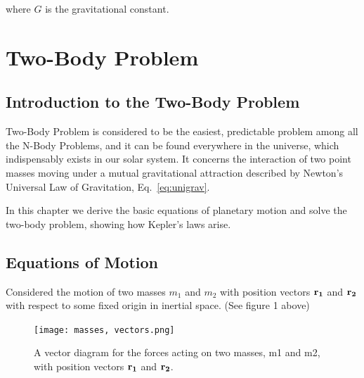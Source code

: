 where $G$ is the gravitational constant.

\section{Two-Body Problem}

\subsection{Introduction to the Two-Body Problem}
Two-Body Problem is considered to be the easiest, predictable problem among all the N-Body Problems, and it can be found everywhere in the universe, which indispensably exists in our solar system. It concerns the interaction of two point masses moving under a mutual gravitational attraction described by Newton's Universal Law of Gravitation, Eq.~\ref{eq:unigrav}.

In this chapter we derive the basic equations of planetary motion and solve the two-body problem, showing how Kepler’s laws arise.

\subsection{Equations of Motion}
Considered the motion of two masses $m_{1}$ and $m_{2}$ with position vectors $\bf{r_1}$ and $\bf{r_2}$ with respect to some fixed origin in inertial space. (See figure 1 above)

\begin{figure}
    \centering
    \texttt{[image: masses, vectors.png]}
    \caption{A vector diagram for the forces acting on two masses, m1 and m2, with position vectors $\bf{r_1}$ and $\bf{r_2}$.}
    \label{fig:masses vectors}
\end{figure}

